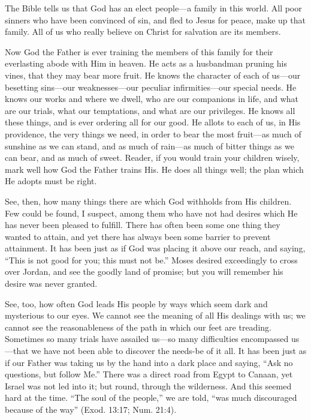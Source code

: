 \documentclass[
]{book}
\begin{document}
The Bible tells us that God has an elect people---a family in this world. All poor sinners who have been convinced of sin, and fled to Jesus for peace, make up that family. All of us who really believe on Christ for salvation are its members.

Now God the Father is ever training the members of this family for their everlasting abode with Him in heaven. He acts as a husbandman pruning his vines, that they may bear more fruit. He knows the character of each of us---our besetting sins---our weaknesses---our peculiar infirmities---our special needs. He knows our works and where we dwell, who are our companions in life, and what are our trials, what our temptations, and what are our privileges. He knows all these things, and is ever ordering all for our good. He allots to each of us, in His providence, the very things we need, in order to bear the most fruit---as much of sunshine as we can stand, and as much of rain---as much of bitter things as we can bear, and as much of sweet. Reader, if you would train your children wisely, mark well how God the Father trains His. He does all things well; the plan which He adopts must be right.

See, then, how many things there are which God withholds from His children. Few could be found, I suspect, among them who have not had desires which He has never been pleased to fulfill. There has often been some one thing they wanted to attain, and yet there has always been some barrier to prevent attainment. It has been just as if God was placing it above our reach, and saying, ``This is not good for you; this must not be.'' Moses desired exceedingly to cross over Jordan, and see the goodly land of promise; but you will remember his desire was never granted.

See, too, how often God leads His people by ways which seem dark and mysterious to our eyes. We cannot see the meaning of all His dealings with us; we cannot see the reasonableness of the path in which our feet are treading. Sometimes so many trials have assailed us---so many difficulties encompassed us---that we have not been able to discover the needs-be of it all. It has been just as if our Father was taking us by the hand into a dark place and saying, ``Ask no questions, but follow Me.'' There was a direct road from Egypt to Canaan, yet Israel was not led into it; but round, through the wilderness. And this seemed hard at the time. ``The soul of the people,'' we are told, ``was much discouraged because of the way'' (Exod. 13:17; Num. 21:4).
\end{document}
